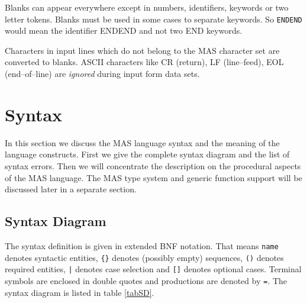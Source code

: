 Blanks can appear everywhere except in 
numbers, identifiers, keywords or two letter tokens. 
Blanks must be used in some cases to separate keywords.
So \verb/ENDEND/ would mean the identifier ENDEND and not two
END keywords.  

Characters in input lines which do not belong to 
the MAS character set are converted to blanks.
ASCII characters like CR (return), LF (line--feed),
EOL (end--of--line) are {\em ignored} during input form
data sets. 


\section{Syntax}

In this section we discuss the MAS language syntax 
and the meaning of the language constructs.
First we give the complete syntax diagram and the 
list of syntax errors. Then we will concentrate 
the description on the procedural aspects of the 
MAS language. The MAS type system and generic function support
will be discussed later in a separate section.


\subsection{Syntax Diagram}

The syntax definition is given in extended BNF
notation. That means
\verb/name/ denotes syntactic entities,
\verb/{}/ denotes (possibly empty) sequences,
\verb/()/ denotes required entities,
\verb/|/ denotes case selection and
\verb/[]/ denotes optional cases. 
Terminal symbols are enclosed in double quotes
and productions are denoted by \verb/=/. 
The syntax diagram is listed in table \ref{tabSD}.


